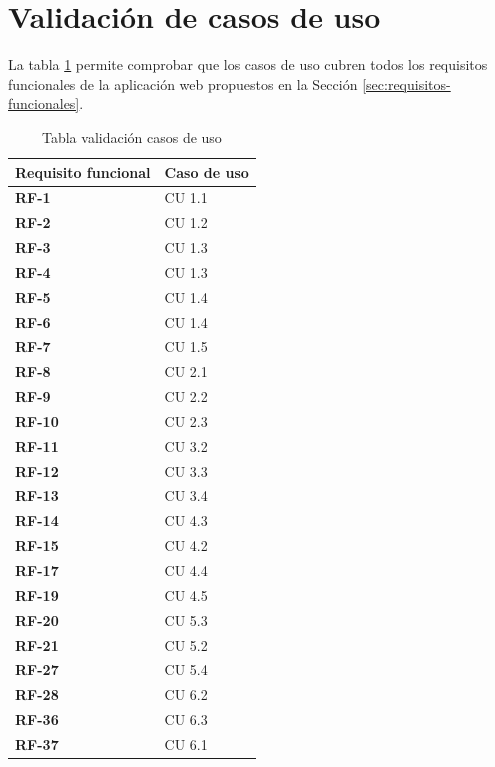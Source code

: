 \newpage

\section{Validación de casos de uso}
La tabla \ref{tab:Validación CU} permite comprobar que los casos de uso cubren todos los requisitos funcionales de la aplicación web propuestos en la Sección \ref{sec:requisitos-funcionales}.
\begin{table}[H]
    \centering
    \caption{Tabla validación casos de uso} \label{tab:Validación CU}
    \begin{tabular}{|l|l|}
        \hline
            \textbf{Requisito funcional} & \textbf{Caso de uso} \\ 
        \hline 
        \hline         
            \textbf{RF-1}  & CU 1.1 \\
            \textbf{RF-2}  & CU 1.2 \\ 
            \textbf{RF-3}  & CU 1.3 \\ 
            \textbf{RF-4}  & CU 1.3 \\ 
            \textbf{RF-5}  & CU 1.4 \\
            \textbf{RF-6}  & CU 1.4 \\ 
            \textbf{RF-7}  & CU 1.5 \\ 
        \hline
            \textbf{RF-8}  & CU 2.1 \\
            \textbf{RF-9}  & CU 2.2 \\
            \textbf{RF-10}  & CU 2.3 \\
        \hline
            \textbf{RF-11}  & CU 3.2 \\
            \textbf{RF-12}  & CU 3.3 \\
            \textbf{RF-13}  & CU 3.4 \\
        \hline
            \textbf{RF-14}  & CU 4.3 \\
            \textbf{RF-15}  & CU 4.2 \\
            \textbf{RF-17}  & CU 4.4 \\
            \textbf{RF-19}  & CU 4.5 \\
        \hline
            \textbf{RF-20}  & CU 5.3 \\
            \textbf{RF-21}  & CU 5.2 \\
            \textbf{RF-27}  & CU 5.4 \\
        \hline
            \textbf{RF-28}  & CU 6.2 \\
            \textbf{RF-36}  & CU 6.3 \\
            \textbf{RF-37}  & CU 6.1 \\

        \hline
    \end{tabular}%
    \end{table}
    
